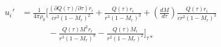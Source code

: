 








\begin{equation}
    \begin{split}
    u_i' 
    &= \frac{1}{4\pi\rho_0} \Bigg[ \frac{(\partial Q(\tau)/\partial \tau)r_i}{c r^2(1 - M_r)^2} 
    + \frac{Q(\tau)r_i}{r^3(1-M_r)^3}
    + \left(\frac{dM}{d\tau} \right) \frac{Q(\tau)r_i}{cr^2(1-M_r)^3} \\
    &\phantom{= \frac{1}{4\pi\rho_0}
    \Bigg[} - \frac{Q(\tau)M^2r_i}{r^3(1-M_r)^3}
    - \frac{Q(\tau)M_i}{r^2(1-M_r)^2}
    \Bigg]_{\tau*}
    \end{split}
    \label{eq:monopole_velocity}
\end{equation}

